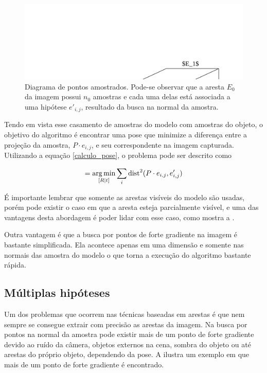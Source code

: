 \begin{figure}[!ht]
\centering\includegraphics{monografia/sample_point_diagram}
\caption{Diagrama de pontos amostrados. Pode-se observar que a aresta $E_0$ da imagem possui $n_0$ amostras e cada uma delas está associada a uma hipótese $e'_{i,j}$, resultado da busca na normal da amostra.}
\label{amostragem_de_pontos}
\end{figure}

Tendo em vista esse casamento de amostras do modelo com amostras do objeto, o objetivo do algoritmo é encontrar uma pose que minimize a diferença entre a projeção da amostra, $P \cdot e_{i,j}$, e seu correspondente na imagem capturada. Utilizando a equação \eqref{calculo_pose}, o problema pode ser descrito como

\begin{equation}
[R | t] = \argmin_{[R | t]} \sum_i \text{dist}^2(P \cdot e_{i,j}, e'_{i,j})
\label{calculo_pose_amostragem}
\end{equation}

É importante lembrar que somente as arestas visíveis do modelo são usadas, porém pode existir o caso em que a aresta esteja parcialmente visível, e uma das vantagens desta abordagem é poder lidar com esse caso, como mostra a .

Outra vantagem é que a busca por pontos de forte gradiente na imagem é bastante simplificada. Ela acontece apenas em uma dimensão e somente nas normais das amostra do modelo o que torna a execução do algoritmo bastante rápida.

\subsection{Múltiplas hipóteses}

Um dos problemas que ocorrem nas técnicas baseadas em arestas é que nem sempre se consegue extrair com precisão as arestas da imagem. Na busca por pontos na normal da amostra pode existir mais de um ponto de forte gradiente devido ao ruído da câmera, objetos externos na cena, sombra do objeto ou até arestas do próprio objeto, dependendo da pose. A  ilustra um exemplo em que mais de um ponto de forte gradiente é encontrado.

